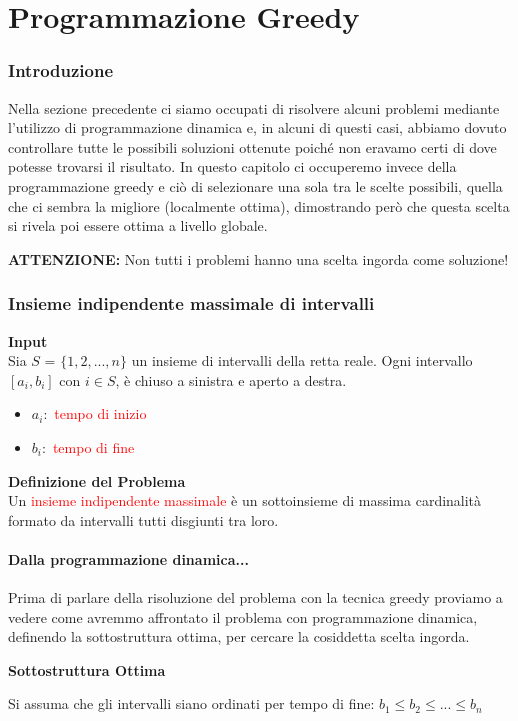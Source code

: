 \documentclass[../cheatSheetAlgoritmi.tex]{subfiles}
\begin{document}
\chapter{Programmazione Greedy}
\subsection{Introduzione}
Nella sezione precedente ci siamo occupati di risolvere alcuni problemi mediante l'utilizzo di programmazione dinamica e, in alcuni di questi casi, abbiamo dovuto controllare tutte le possibili soluzioni ottenute poiché non eravamo certi di dove potesse trovarsi il risultato. In questo capitolo ci occuperemo invece della programmazione greedy e ciò di selezionare una sola tra le scelte possibili, quella che ci sembra la migliore (localmente ottima), dimostrando però che questa scelta si rivela poi essere ottima a livello globale.

\textbf{ATTENZIONE:} Non tutti i problemi hanno una scelta ingorda come soluzione!
\subsection{Insieme indipendente massimale di intervalli}
\textbf{Input}\\
Sia $S$ = $\{1, 2, ..., n\}$ un insieme di intervalli della retta reale. Ogni intervallo $[a_i, b_i]$ con $i \in S$, è chiuso a sinistra e aperto a destra.
\begin{itemize}
	\item  $a_i:$ \textcolor{red}{tempo di inizio}
	\item  $b_i:$ \textcolor{red}{tempo di fine}
\end{itemize}
\textbf{Definizione del Problema} \\
Un \textcolor{red}{insieme indipendente massimale} è un sottoinsieme di massima cardinalità formato da intervalli tutti disgiunti tra loro.
\subsubsection{Dalla programmazione dinamica...}
Prima di parlare della risoluzione del problema con la tecnica greedy proviamo a vedere come avremmo affrontato il problema con programmazione dinamica, definendo la sottostruttura ottima, per cercare la cosiddetta scelta ingorda.

\textbf{Sottostruttura Ottima}

Si assuma che gli intervalli siano ordinati per tempo di fine: $b_1 \leq b_2 \leq ... \leq b_n$
\end{document}
